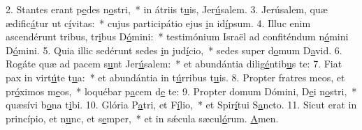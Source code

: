 2. Stantes erant p\uline{e}des n\uline{o}stri,~* in átriis t\uline{u}is, Jer\uline{ú}salem.
3. Jerúsalem, quæ ædific\uline{á}tur ut c\uline{í}vitas:~* cujus participátio ejus \uline{i}n id\uline{í}psum.
4. Illuc enim ascendérunt tribus, tr\uline{i}bus D\uline{ó}mini:~* testimónium Israël ad confiténdum n\uline{ó}mini D\uline{ó}mini.
5. Quia illic sedérunt sedes \uline{i}n jud\uline{í}cio,~* sedes super d\uline{o}mum D\uline{a}vid.
6. Rogáte quæ ad pacem s\uline{u}nt Jer\uline{ú}salem:~* et abundántia dilig\uline{é}ntib\uline{u}s te:
7. Fiat pax in virt\uline{ú}te t\uline{u}a:~* et abundántia in t\uline{ú}rribus t\uline{u}is.
8. Propter fratres meos, et pr\uline{ó}ximos m\uline{e}os,~* loquébar p\uline{a}cem d\uline{e} te:
9. Propter domum Dómini, D\uline{e}i n\uline{o}stri,~* quæsívi b\uline{o}na t\uline{i}bi.
10. Glória P\uline{a}tri, et F\uline{í}lio,~* et Spir\uline{í}tui S\uline{a}ncto.
11. Sicut erat in princípio, et n\uline{u}nc, et s\uline{e}mper,~* et in sǽcula sæcul\uline{ó}rum. \uline{A}men.
